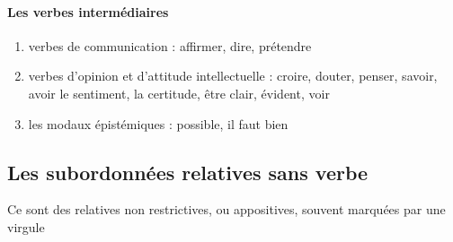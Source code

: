 \documentclass[UTF8]{report}
\begin{document}
\paragraph{Les verbes intermédiaires}
\begin{enumerate}
    \item verbes de communication : affirmer, dire, prétendre
    \item verbes d’opinion et d’attitude intellectuelle : croire, douter, penser, savoir, avoir le sentiment, la certitude, être clair, évident, voir
    \item les modaux épistémiques : possible, il faut bien
\end{enumerate}

\subsection{Les subordonnées relatives sans verbe}
Ce sont des relatives non restrictives, ou appositives, souvent marquées par une virgule
\end{document}
